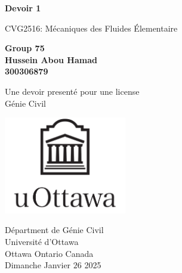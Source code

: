 \begin{titlepage}
    \begin{center}
        \vspace*{1cm}
 
        \textbf{Devoir 1}
 
        \vspace{0.5cm}
        CVG2516: Mécaniques des Fluides Élementaire
        \vspace{1.5cm}
        
        \textbf{Group 75}\\
        \textbf{Hussein Abou Hamad}\\
        \textbf{300306879}
 
        \vfill
             
        Une devoir presenté pour une license\\
        Génie Civil
             
        \vspace{0.8cm}
      
        \includegraphics[width=0.4\textwidth]{university.png}
        
        Départment de Génie Civil\\
        Université d'Ottawa\\
        Ottawa Ontario Canada\\
        Dimanche Janvier $26$ 2025\\
    \end{center}
 \end{titlepage}